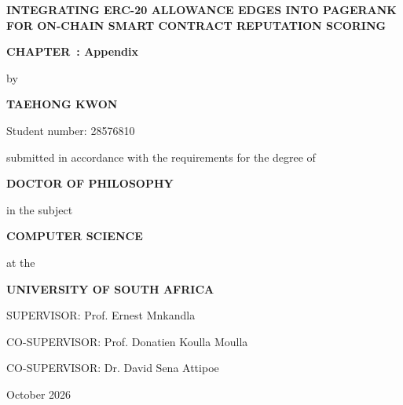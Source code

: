 \ifcase\ChapterOnly\relax
\or
  \def\ChapterCoverTitle{Introduction and Research Problem}%
\or
  \def\ChapterCoverTitle{Literature Review and Theoretical Framework}%
\or
  \def\ChapterCoverTitle{Research Methodology}%
\or
  \def\ChapterCoverTitle{Implementation and Empirical Results}%
\or
  \def\ChapterCoverTitle{Discussion}%
\or
  \def\ChapterCoverTitle{Conclusion and Future Work}%
\or
  \def\ChapterCoverTitle{References}%
\or
  \def\ChapterCoverTitle{Appendix}%
\fi

\begin{titlepage}
\centering
\vspace*{0.4cm}
{\Large\bfseries INTEGRATING ERC-20 ALLOWANCE EDGES INTO PAGERANK FOR ON-CHAIN SMART CONTRACT REPUTATION SCORING\par}
\vspace{1.2cm}
{\large\bfseries CHAPTER~\ChapterOnly: \ChapterCoverTitle\par}
\vfill
{by\par}
\vspace{0.7cm}
{\large\bfseries TAEHONG KWON\par}
\vspace{0.35cm}
{Student number: 28576810\par}
\vfill
{submitted in accordance with the requirements for the degree of\par}
\vspace{0.7cm}
{\large\bfseries DOCTOR OF PHILOSOPHY\par}
\vspace{0.35cm}
{in the subject\par}
\vspace{0.7cm}
{\large\bfseries COMPUTER SCIENCE\par}
\vfill
{at the\par}
\vspace{0.7cm}
{\large\bfseries UNIVERSITY OF SOUTH AFRICA\par}
\vfill
{SUPERVISOR: Prof. Ernest Mnkandla\par}
\vspace{0.35cm}
{CO-SUPERVISOR: Prof. Donatien Koulla Moulla\par}
\vspace{0.35cm}
{CO-SUPERVISOR: Dr. David Sena Attipoe\par}
\vfill
{October 2026\par}
\end{titlepage}
\restoregeometry
\ifdefined\ChapterStartPage
  \setcounter{page}{\ChapterStartPage}%
\fi
